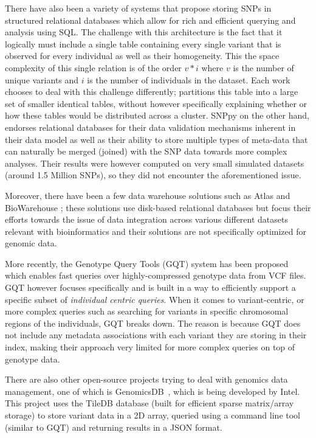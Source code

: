 \documentclass[conference,twocolumn,10pt]{IEEEtran}
\begin{document}
There have also been a variety of systems \cite{bouffard2010damming, mitha2011snppy} that propose storing SNPs in structured relational databases \cite{codd1970relational} which allow for rich and efficient querying and analysis using SQL. The challenge with this architecture is the fact that it logically must include a single table containing every single variant that is observed for every individual as well as their homogeneity. This the space complexity of this single relation is of the order $v * i$ where $v$ is the number of unique variants and $i$ is the number of individuals in the dataset. Each work chooses to deal with this challenge differently; \cite{bouffard2010damming} partitions this table into a large set of smaller identical tables, without however specifically explaining whether or how these tables would be distributed across a cluster. SNPpy \cite{mitha2011snppy} on the other hand, endorses relational databases for their data validation mechanisms inherent in their data model as well as their ability to store multiple types of meta-data that can naturally be merged (joined) with the SNP data towards more complex analyses. Their results were however computed on very small simulated datasets (around 1.5 Million SNPs), so they did not encounter the aforementioned issue.

Moreover, there have been a few data warehouse solutions such as Atlas \cite{shah2005atlas} and BioWarehouse \cite{lee2006biowarehouse}; these solutions use disk-based relational databases but focus their efforts towards the issue of data integration across various different datasets relevant with bioinformatics and their solutions are not specifically optimized for genomic data.

More recently, the Genotype Query Tools (GQT) \cite{layer2016efficient} system has been proposed which enables fast queries over highly-compressed genotype data from VCF files. GQT however focuses specifically and is built in a way to efficiently support a specific subset of \textit{individual centric queries}. When it comes to variant-centric, or more complex queries such as searching for variants in specific chromosomal regions of the individuals, GQT breaks down. The reason is because GQT does not include any metadata associations with each variant they are storing in their index, making their approach very limited for more complex queries on top of genotype data.

There are also other open-source projects trying to deal with genomics data management, one of which is GenomicsDB~\cite{genomicsDB}, which is being developed by Intel. This project uses the TileDB \cite{tileDB} database (built for efficient sparse matrix/array storage) to store variant data in a 2D array, queried using a command line tool (similar to GQT) and returning results in a JSON format.
\end{document}
